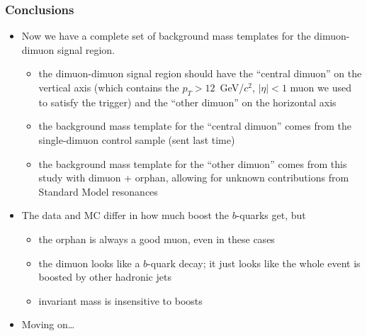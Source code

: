 \documentclass[compress]{beamer}
\begin{document}
\begin{frame}
\frametitle{Conclusions}

\begin{itemize}
\item Now we have a complete set of background mass templates for the dimuon-dimuon signal region.
\begin{itemize}
\item the dimuon-dimuon signal region should have the ``central dimuon'' on the vertical axis (which contains the $p_T > 12$~GeV/$c^2$, $|\eta| < 1$ muon we used to satisfy the trigger) and the ``other dimuon'' on the horizontal axis
\item the background mass template for the ``central dimuon'' comes from the single-dimuon control sample (sent last time)
\item the background mass template for the ``other dimuon'' comes from this study with dimuon + orphan, allowing for unknown contributions from Standard Model resonances
\end{itemize}

\item The data and MC differ in how much boost the $b$-quarks get, but
\begin{itemize}
\item the orphan is always a good muon, even in these cases
\item the dimuon looks like a $b$-quark decay; it just looks like the whole event is boosted by other hadronic jets
\item invariant mass is insensitive to boosts
\end{itemize}

\item Moving on\ldots
\end{itemize}

\label{numpages}
\end{frame}
\end{document}
